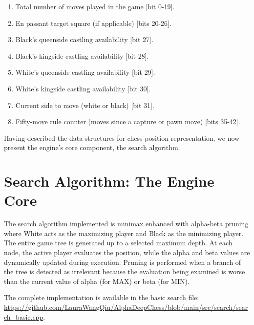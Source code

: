 \begin{enumerate}
    \item Total number of moves played in the game [bit 0-19]. 
    \item En passant target square (if applicable) [bits 20-26].
    \item Black's queenside castling availability [bit 27].
    \item Black's kingside castling availability [bit 28].
    \item White's queenside castling availability [bit 29].
    \item White's kingside castling availability [bit 30].
    \item Current side to move (white or black) [bit 31].
    \item Fifty-move rule counter (moves since a capture or pawn move) [bits 35-42].
\end{enumerate}

\vspace{2em}

\noindent Having described the data structures for chess position representation, we now present the engine's core component, the search algorithm.

\newpage

\section{Search Algorithm: The Engine Core}

The search algorithm implemented is minimax enhanced with alpha-beta pruning  where White acts as the maximizing player and Black as the minimizing player. The entire game tree is generated up to a selected maximum depth. At each node, the active player evaluates the position, while the alpha and beta values are dynamically updated during execution. Pruning is performed when a branch of the tree is detected as irrelevant because the evaluation being examined is worse than the current value of alpha (for MAX) or beta (for MIN).

\vspace{1em}

\noindent The complete implementation is available in the basic search file: \\
\scriptsize\url{https://github.com/LauraWangQiu/AlphaDeepChess/blob/main/src/search/search_basic.cpp}\normalsize.

\vspace{2em}


